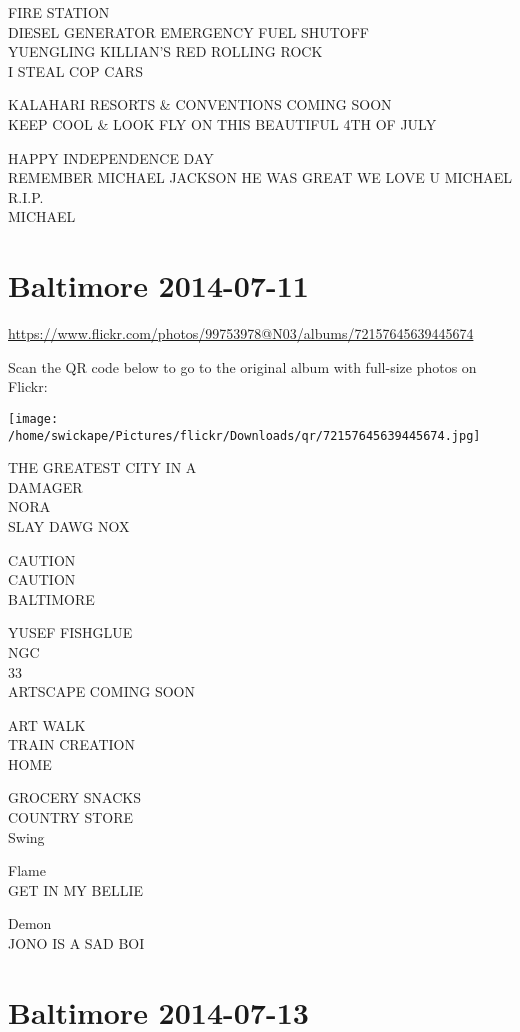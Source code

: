 \documentclass[10pt,letterpaper]{article}
\begin{document}
FIRE STATION\\
DIESEL GENERATOR EMERGENCY FUEL SHUTOFF\\
YUENGLING KILLIAN'S RED ROLLING ROCK\\
I STEAL COP CARS

KALAHARI RESORTS \& CONVENTIONS COMING SOON\\
KEEP COOL \& LOOK FLY ON THIS BEAUTIFUL 4TH OF JULY

HAPPY INDEPENDENCE DAY\\
REMEMBER MICHAEL JACKSON HE WAS GREAT WE LOVE U MICHAEL R.I.P.\\
MICHAEL


\section*{Baltimore 2014-07-11}

\url{https://www.flickr.com/photos/99753978@N03/albums/72157645639445674}

Scan the QR code below to go to the original album with full-size photos on Flickr:

\texttt{[image: /home/swickape/Pictures/flickr/Downloads/qr/72157645639445674.jpg]}


THE GREATEST CITY IN A\\
DAMAGER\\
NORA\\
SLAY DAWG NOX

CAUTION\\
CAUTION\\
BALTIMORE

YUSEF FISHGLUE\\
NGC\\
33\\
ARTSCAPE COMING SOON

ART WALK\\
TRAIN CREATION\\
HOME

GROCERY SNACKS\\
COUNTRY STORE\\
Swing

Flame\\
GET IN MY BELLIE

Demon\\
JONO IS A SAD BOI


\section*{Baltimore 2014-07-13}
\end{document}
